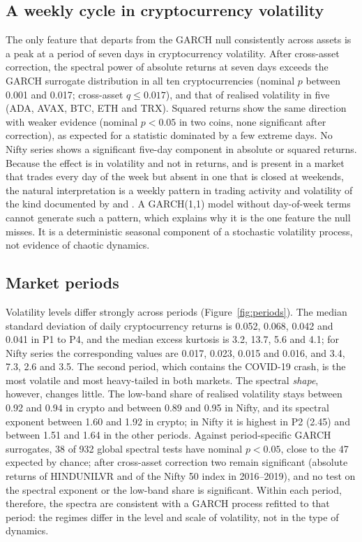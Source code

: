 \documentclass[11pt,a4paper]{article}
\begin{document}
\subsection{A weekly cycle in cryptocurrency volatility}

The only feature that departs from the GARCH null consistently across assets is a peak at a period of seven days in
cryptocurrency volatility. After cross-asset correction, the spectral power of absolute returns at seven days exceeds
the GARCH surrogate distribution in all ten cryptocurrencies (nominal $p$ between 0.001 and 0.017; cross-asset $q\le
0.017$), and that of realised volatility in five (ADA, AVAX, BTC, ETH and TRX). Squared returns show the same direction
with weaker evidence (nominal $p<0.05$ in two coins, none significant after correction), as expected for a statistic
dominated by a few extreme days. No Nifty series shows a significant five-day component in absolute or squared
returns. Because the effect is in volatility and not in returns, and is present in a market that trades every day of
the week but absent in one that is closed at weekends, the natural interpretation is a weekly pattern in trading
activity and volatility of the kind documented by \citet{Baur2019} and \citet{AharonQadan2019}. A GARCH(1,1) model
without day-of-week terms cannot generate such a pattern, which explains why it is the one feature the null misses.
It is a deterministic seasonal component of a stochastic volatility process, not evidence of chaotic dynamics.

\subsection{Market periods}

Volatility levels differ strongly across periods (Figure~\ref{fig:periods}). The median standard deviation of daily
cryptocurrency returns is 0.052, 0.068, 0.042 and 0.041 in P1 to P4, and the median excess kurtosis is 3.2, 13.7, 5.6 and
4.1; for Nifty series the corresponding values are 0.017, 0.023, 0.015 and 0.016, and 3.4, 7.3, 2.6 and 3.5. The
second period, which contains the COVID-19 crash, is the most volatile and most heavy-tailed in both markets. The
spectral \emph{shape}, however, changes little. The low-band share of realised volatility stays between 0.92 and 0.94
in crypto and between 0.89 and 0.95 in Nifty, and its spectral exponent between 1.60 and 1.92 in crypto; in Nifty it
is highest in P2 (2.45) and between 1.51 and 1.64 in the other periods. Against period-specific GARCH surrogates, 38 of
932 global spectral tests have nominal $p<0.05$, close to the 47 expected by chance; after cross-asset correction two
remain significant (absolute returns of HINDUNILVR and of the Nifty 50 index in 2016--2019), and no test on the
spectral exponent or the low-band share is significant. Within each period, therefore, the spectra are consistent
with a GARCH process refitted to that period: the regimes differ in the level and scale of volatility, not in the
type of dynamics.
\end{document}
